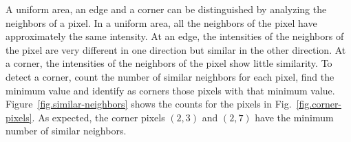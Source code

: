 
A uniform area, an edge and a corner can be distinguished by analyzing the neighbors of a pixel. In a uniform area, all the neighbors of the pixel have approximately the same intensity. At an edge, the intensities of the neighbors of the pixel are very different in one direction but similar in the other direction. At a corner, the intensities of the neighbors of the pixel show little similarity. To detect a corner, count the number of similar neighbors for each pixel, find the minimum value and identify as corners those pixels with that minimum value. Figure~\ref{fig.similar-neighbors} shows the counts for the pixels in Fig.~\ref{fig.corner-pixels}. As expected, the corner pixels $(2,3)$ and $(2,7)$ have the minimum number of similar neighbors.

